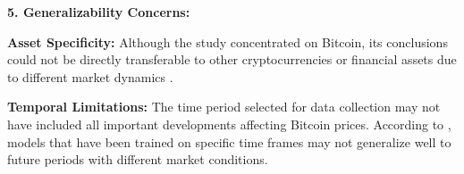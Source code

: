 \textbf{5. Generalizability Concerns:}

\textbf{Asset Specificity:} Although the study concentrated on Bitcoin, its conclusions could not be directly transferable to other cryptocurrencies or financial assets due to different market dynamics \citep{corbet2018bitcoin}.

\textbf{Temporal Limitations:} The time period selected for data collection may not have included all important developments affecting Bitcoin prices. According to \cite{bao2017deep}, models that have been trained on specific time frames may not generalize well to future periods with different market conditions.